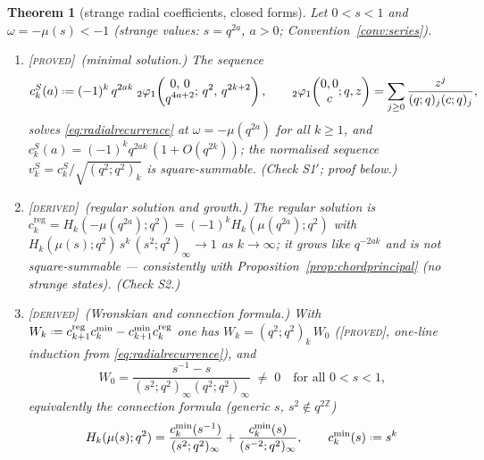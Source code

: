 \documentclass[11pt,a4paper]{article}
\providecommand{\coloneqq}{\mathrel{\vcenter{\baselineskip0.5ex \lineskiplimit0pt
      \hbox{\scriptsize.}\hbox{\scriptsize.}}}=}
\newcommand{\PROVED}{{\color{ForestGreen}\textsc{[proved]}}}
\newcommand{\DERIVED}{{\color{teal}\textsc{[derived]}}}
\theoremstyle{definition}
\theoremstyle{plain}
\newtheorem{theorem}[definition]{Theorem}
\newcommand{\Z}{\mathbb{Z}}
\begin{document}
\begin{theorem}[strange radial coefficients, closed forms]\label{thm:strangeradial}
Let $0<s<1$ and $\omega=-\mu(s)<-1$ (strange values: $s=q^{2a}$, $a>0$;
Convention~\ref{conv:series}).
\begin{enumerate}[label=(\alph*)]
\item \PROVED\ \emph{(minimal solution.)} The sequence
\begin{equation}\label{eq:minimalsolution}
  c^{S}_{k}(a)\coloneqq(-1)^{k}\,q^{2ak}\;
  {}_{2}\varphi_{1}\!\left(\begin{matrix}0,\,0\\ q^{4a+2}\end{matrix};\,q^{2},\,
  q^{2k+2}\right),
  \qquad
  {}_{2}\varphi_{1}\!\left(\begin{matrix}0,0\\ c\end{matrix};q,z\right)
  =\sum_{j\ge0}\frac{z^{j}}{(q;q)_{j}(c;q)_{j}},
\end{equation}
solves \eqref{eq:radialrecurrence} at $\omega=-\mu(q^{2a})$ for all $k\ge1$, and
$c^{S}_{k}(a)=(-1)^{k}q^{2ak}\,(1+O(q^{2k}))$; the normalised sequence
$v^{S}_{k}=c^{S}_{k}/\sqrt{(q^{2};q^{2})_{k}}$ is square-summable. (Check S1$'$;
proof below.)
\item \DERIVED\ \emph{(regular solution and growth.)} The regular solution is
$c^{\mathrm{reg}}_{k}=H_{k}(-\mu(q^{2a});q^{2})=(-1)^{k}H_{k}(\mu(q^{2a});q^{2})$ with
$H_{k}(\mu(s);q^{2})\,s^{k}\,(s^{2};q^{2})_{\infty}\to1$ as $k\to\infty$; it grows like
$q^{-2ak}$ and is not square-summable --- consistently with
Proposition~\ref{prop:chordprincipal} (no strange states). (Check S2.)
\item \DERIVED\ \emph{(Wronskian and connection formula.)} With
$W_{k}\coloneqq c^{\mathrm{reg}}_{k+1}c^{\mathrm{min}}_{k}-c^{\mathrm{min}}_{k+1}
c^{\mathrm{reg}}_{k}$ one has $W_{k}=(q^{2};q^{2})_{k}\,W_{0}$ (\PROVED, one-line induction from
\eqref{eq:radialrecurrence}), and
\begin{equation}\label{eq:jost}
  W_{0}=\frac{s^{-1}-s}{(s^{2};q^{2})_{\infty}(q^{2};q^{2})_{\infty}}\;\neq\;0
  \quad\text{for all }0<s<1,
\end{equation}
equivalently the connection formula (generic $s$, $s^{2}\notin q^{2\Z}$)
\begin{equation}\label{eq:connection}
  H_{k}(\mu(s);q^{2})
  =\frac{c^{\mathrm{min}}_{k}(s^{-1})}{(s^{2};q^{2})_{\infty}}
  +\frac{c^{\mathrm{min}}_{k}(s)}{(s^{-2};q^{2})_{\infty}},
  \qquad
  c^{\mathrm{min}}_{k}(s)\coloneqq s^{k}\,

\end{equation}
\end{enumerate}
\end{theorem}
\end{document}
